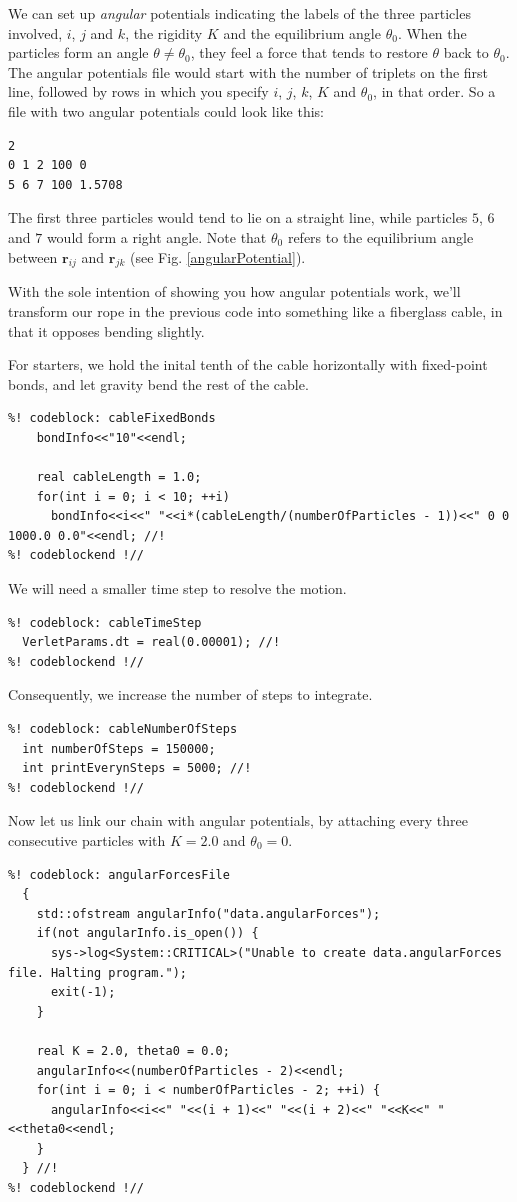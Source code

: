 We can set up \textit{angular} potentials indicating the labels of the three 
particles involved, $i$, $j$ and $k$, the rigidity $K$ and the equilibrium angle 
$\theta_0$. When the particles form an angle $\theta \neq \theta_0$, they feel a 
force that tends to restore $\theta$ back to $\theta_0$. The angular potentials 
file would start with the number of triplets on the first line, followed by rows 
in which you specify $i$, $j$, $k$, $K$ and $\theta_0$, in that order. So a file 
with two angular potentials could look like this:
\begin{lstlisting}
2
0 1 2 100 0
5 6 7 100 1.5708
\end{lstlisting}
The first three particles would tend to lie on a straight line, while particles 
$5$, $6$ and $7$ would form a right angle. Note that $\theta_0$ refers to the 
equilibrium angle between $\mathbf{r}_{ij}$ and $\mathbf{r}_{jk}$ (see Fig. 
\ref{angularPotential}).

With the sole intention of showing you how angular potentials work, we'll 
transform our rope in the previous code into something like a fiberglass cable, 
in that it opposes bending slightly.

For starters, we hold the inital tenth of the cable horizontally with
fixed-point bonds, and let gravity bend the rest of the cable.
\begin{lstlisting}
%! codeblock: cableFixedBonds
    bondInfo<<"10"<<endl;

    real cableLength = 1.0;
    for(int i = 0; i < 10; ++i)
      bondInfo<<i<<" "<<i*(cableLength/(numberOfParticles - 1))<<" 0 0 1000.0 0.0"<<endl; //!
%! codeblockend !//
\end{lstlisting}
We will need a smaller time step to resolve the motion.
\begin{lstlisting}
%! codeblock: cableTimeStep
  VerletParams.dt = real(0.00001); //!
%! codeblockend !//
\end{lstlisting}
Consequently, we increase the number of steps to integrate.
\begin{lstlisting}
%! codeblock: cableNumberOfSteps
  int numberOfSteps = 150000;
  int printEverynSteps = 5000; //!
%! codeblockend !//
\end{lstlisting}

Now let us link our chain with angular potentials, by attaching every three
consecutive particles with $K = 2.0$ and $\theta_0 = 0$.
\begin{lstlisting}
%! codeblock: angularForcesFile
  {
    std::ofstream angularInfo("data.angularForces");
    if(not angularInfo.is_open()) {
      sys->log<System::CRITICAL>("Unable to create data.angularForces file. Halting program.");
      exit(-1);
    }

    real K = 2.0, theta0 = 0.0;
    angularInfo<<(numberOfParticles - 2)<<endl;
    for(int i = 0; i < numberOfParticles - 2; ++i) {
      angularInfo<<i<<" "<<(i + 1)<<" "<<(i + 2)<<" "<<K<<" "<<theta0<<endl;
    }
  } //!
%! codeblockend !//
\end{lstlisting}

